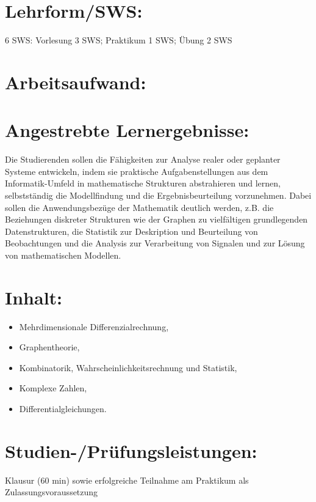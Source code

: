 \section{Lehrform/SWS:}\label{lehrformsws-14}

6 SWS: Vorlesung 3 SWS; Praktikum 1 SWS; Übung 2 SWS

\section{Arbeitsaufwand:}\label{arbeitsaufwand-14}

\section{Angestrebte
Lernergebnisse:}\label{angestrebte-lernergebnisse-14}

Die Studierenden sollen die Fähigkeiten zur Analyse realer oder
geplanter Systeme entwickeln, indem sie praktische Aufgabenstellungen
aus dem Informatik-Umfeld in mathematische Strukturen abstrahieren und
lernen, selbstständig die Modellfindung und die Ergebnisbeurteilung
vorzunehmen. Dabei sollen die Anwendungsbezüge der Mathematik deutlich
werden, z.B. die Beziehungen diskreter Strukturen wie der Graphen zu
vielfältigen grundlegenden Datenstrukturen, die Statistik zur
Deskription und Beurteilung von Beobachtungen und die Analysis zur
Verarbeitung von Signalen und zur Lösung von mathematischen Modellen.

\section{Inhalt:}\label{inhalt-14}

\begin{itemize}
\tightlist
\item
  Mehrdimensionale Differenzialrechnung,
\item
  Graphentheorie,
\item
  Kombinatorik, Wahrscheinlichkeitsrechnung und Statistik,
\item
  Komplexe Zahlen,
\item
  Differentialgleichungen.
\end{itemize}

\section{Studien-/Prüfungsleistungen:}\label{studien-pruxfcfungsleistungen-14}

Klausur (60 min) sowie erfolgreiche Teilnahme am Praktikum als
Zulassungsvoraussetzung


